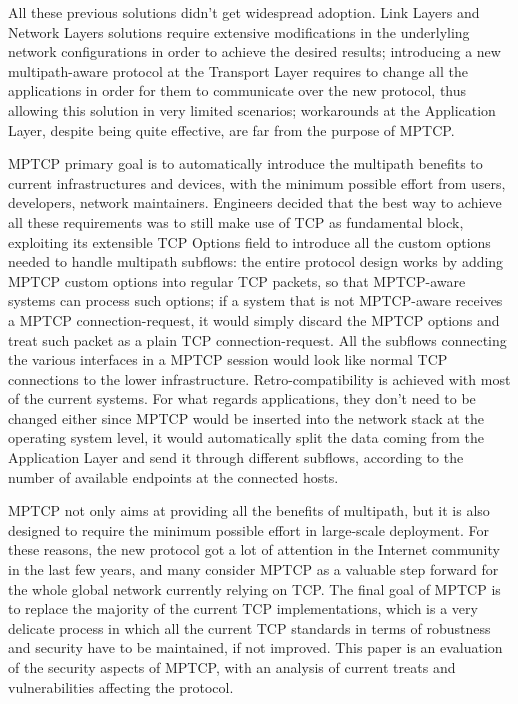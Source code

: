 \vspace{5mm}
All these previous solutions didn't get widespread adoption. Link Layers and Network Layers solutions require extensive modifications in the underlyling network configurations in order to achieve the desired results; introducing a new multipath-aware protocol at the Transport Layer requires to change all the applications in order for them to communicate over the new protocol, thus allowing this solution in very limited scenarios; workarounds at the Application Layer, despite being quite effective, are far from the purpose of MPTCP.


MPTCP primary goal is to automatically introduce the multipath benefits to current infrastructures and devices, with the minimum possible effort from users, developers, network maintainers. Engineers decided that the best way to achieve all these requirements was to still make use of TCP as fundamental block, exploiting its extensible TCP Options field to introduce all the custom options needed to handle multipath subflows: the entire protocol design works by adding MPTCP custom options into regular TCP packets, so that MPTCP-aware systems can process such options; if a system that is not MPTCP-aware receives a MPTCP connection-request, it would simply discard the MPTCP options and treat such packet as a plain TCP connection-request. All the subflows connecting the various interfaces in a MPTCP session would look like normal TCP connections to the lower infrastructure. Retro-compatibility is achieved with most of the current systems. For what regards applications, they don't need to be changed either since MPTCP would be inserted into the network stack at the operating system level, it would automatically split the data coming from the Application Layer and send it through different subflows, according to the number of available endpoints at the connected hosts.

\vspace{5mm}
MPTCP not only aims at providing all the benefits of multipath, but it is also designed to require the minimum possible effort in large-scale deployment. For these reasons, the new protocol got a lot of attention in the Internet community in the last few years, and many consider MPTCP as a valuable step forward for the whole global network currently relying on TCP.
The final goal of MPTCP is to replace the majority of the current TCP implementations, which is a very delicate process in which all the current TCP standards in terms of robustness and security have to be maintained, if not improved. This paper is an evaluation of the security aspects of MPTCP, with an analysis of current treats and vulnerabilities affecting the protocol.

